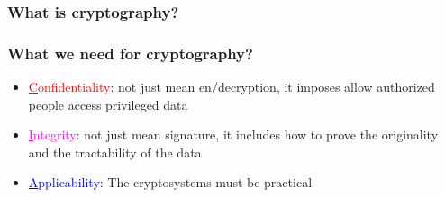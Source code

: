 \documentclass{beamer}
\begin{document}
\frame
{
  \frametitle{What is cryptography?}


}

\frame
{
 \frametitle{What we need for cryptography?}

 \begin{itemize}
 \setlength{\itemsep}{12pt}
 \item \textcolor{red}{\underline{C}onfidentiality}: not just mean en/decryption, it imposes allow authorized people access privileged data
 \item \textcolor{magenta}{\underline{I}ntegrity}: not just mean signature, it includes how to prove the originality and the tractability of the data
 \item \textcolor{blue}{\underline{A}pplicability}: The cryptosystems must be practical
 \end{itemize}
}
\end{document}
